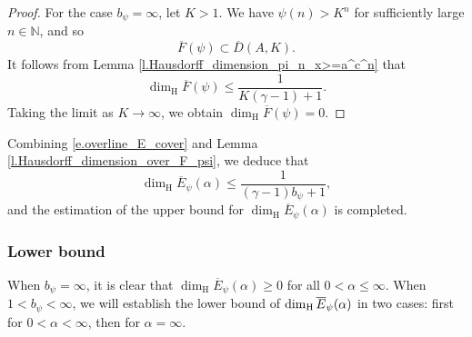 \documentclass[12pt,reqno]{amsart}
\renewcommand{\=}{\coloneqq}
\theoremstyle{plain}
\begin{document}
\begin{proof}
  For the case $b_\psi=\infty$, let $K>1$. We have $\psi(n)>K^n$ for sufficiently large $n \in \mathbb N$,
    and so
    \begin{equation*}
        \overline{F}(\psi)\subset
        \overline{D}(A,K).
    \end{equation*}
 It follows from Lemma \ref{l.Hausdorff_dimension_pi_n_x>=a^c^n}
    that $$\dim_{\mathrm{H}}\overline{F}(\psi)\leq \frac{1}{K(\gamma-1)+1}.$$
   Taking the limit as $K\to \infty$, we obtain $\dim_{\mathrm{H}}\overline{F}(\psi)=0$.
    \end{proof}


   Combining \eqref{e.overline_E_cover} and Lemma \ref{l.Hausdorff_dimension_over_F_psi},
    we deduce that
    \begin{equation*}
   \dim_{\mathrm{H}}\overline{E}_{\psi}(\alpha)
         \leq \frac{1}{(\gamma-1)b_\psi+1},
    \end{equation*}
    and the estimation of the upper bound for $\dim_{\mathrm{H}}\overline{E}_{\psi}(\alpha)$ is completed.


\subsubsection{Lower bound}\label{constrction}
When $b_\psi=\infty$, it is clear that $\dim_{\mathrm{H}}\overline{E}_{\psi}(\alpha) \geq 0$ for all $0<\alpha \leq \infty$. When $1<b_\psi<\infty$, we will establish the lower bound of $\dim_{\rm H}\overline{E}_{\psi}(\alpha)$ in two cases: first for $0<\alpha<\infty$, then for $\alpha =\infty$.
\end{document}
